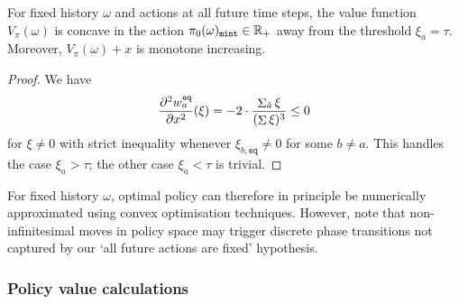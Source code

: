 \begin{proposition}

  For fixed history $\omega$ and actions at all future time steps, the value function $V_\pi(\omega)$ is concave in the action $\pi_0(\omega)_\mathtt{mint}\in\mathbb{R}_+$ away from the threshold $\xi_a=\tau$.
  Moreover, $V_\pi(\omega)+x$ is monotone increasing.

\end{proposition}
%
\begin{proof}

  We have
  \[
    \frac {\partial^2 w_a^{\mathtt{eq}}} {\partial x^2} (\xi) = -2\cdot\frac {\mathop{\Sigma}_{\hat a}\xi} {(\mathop{\Sigma} \xi)^3} \leq 0
  \]
  for $\xi\neq 0$ with strict inequality whenever $\xi_{b,\mathtt{eq}}\neq 0$ for some $b\neq a$. 
  This handles the case $\xi_a>\tau$; the other case $\xi_a<\tau$ is trivial. \qedhere

\end{proof}

For fixed history $\omega$, optimal policy can therefore in principle be numerically approximated using convex optimisation techniques.
%
However, note that non-infinitesimal moves in policy space may trigger discrete phase transitions not captured by our `all future actions are fixed' hypothesis.






\subsubsection{Policy value calculations}
\label{section:policy-value}

